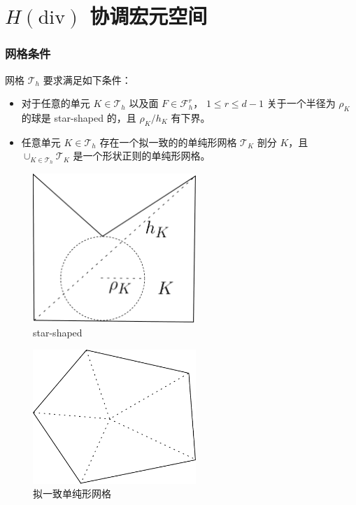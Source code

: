 \documentclass[notheorems,serif]{beamer}
\begin{document}
\section{$H(\mathrm{div})$ 协调宏元空间}
\begin{frame}
  \frametitle{网格条件}
  网格 $\mathcal{T}_h$ 要求满足如下条件：
  \begin{itemize}
    \item 对于任意的单元 $K \in \mathcal{T}_h$ 以及面 $F \in \mathcal{F}_h^r$，
        $1 \leq r \leq d-1$ 关于一个半径为 $\rho_K$ 的球是 star-shaped 的，且
        $\rho_K/h_K$ 有下界。
    \item 任意单元 $K \in \mathcal{T}_h$ 存在一个拟一致的的单纯形网格
        $\mathcal{T}_K$ 剖分 $K$，且 $\cup_{K \in \mathcal{T}_h}\mathcal{T}_K$
        是一个形状正则的单纯形网格。
  \end{itemize}
  \vspace{10pt}
\begin{minipage}[b]{0.49\linewidth}
    \begin{figure}[htpb]
      \centering
      \includegraphics[width=0.55\textwidth]{../figures/star-shaped.pdf}
      \caption{star-shaped}
    \end{figure}
\end{minipage}
\hfill
\begin{minipage}[b]{0.49\linewidth}
    \centering
    \begin{figure}[htpb]
        \centering
        \includegraphics[width=0.55\textwidth]{../figures/splite_polygon.pdf}
        \caption{拟一致单纯形网格}
    \end{figure}
\end{minipage}

\end{frame}
\end{document}
